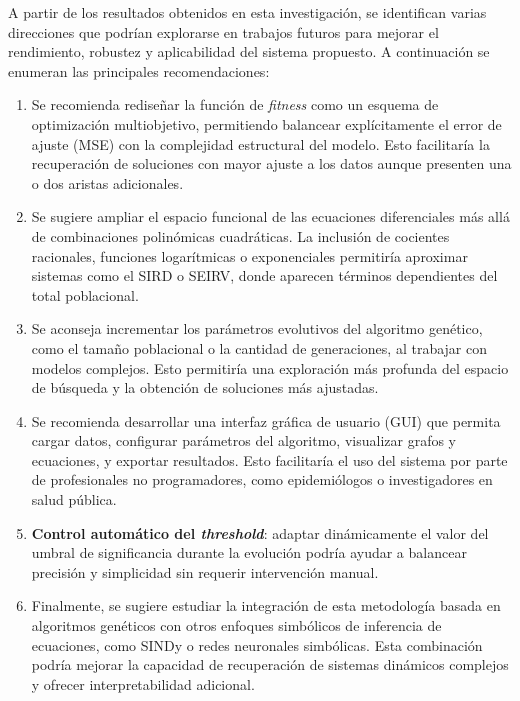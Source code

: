 \begin{recomendations}

A partir de los resultados obtenidos en esta investigación, se identifican varias direcciones que podrían explorarse en trabajos futuros para mejorar el rendimiento, robustez y aplicabilidad del sistema propuesto. A continuación se enumeran las principales recomendaciones:

\begin{enumerate}
    \item Se recomienda rediseñar la función de \textit{fitness} como un esquema de optimización multiobjetivo, permitiendo balancear explícitamente el error de ajuste (MSE) con la complejidad estructural del modelo. Esto facilitaría la recuperación de soluciones con mayor ajuste a los datos aunque presenten una o dos aristas adicionales.

    \item Se sugiere ampliar el espacio funcional de las ecuaciones diferenciales más allá de combinaciones polinómicas cuadráticas. La inclusión de cocientes racionales, funciones logarítmicas o exponenciales permitiría aproximar sistemas como el SIRD o SEIRV, donde aparecen términos dependientes del total poblacional.

    \item Se aconseja incrementar los parámetros evolutivos del algoritmo genético, como el tamaño poblacional o la cantidad de generaciones, al trabajar con modelos complejos. Esto permitiría una exploración más profunda del espacio de búsqueda y la obtención de soluciones más ajustadas.

    \item Se recomienda desarrollar una interfaz gráfica de usuario (GUI) que permita cargar datos, configurar parámetros del algoritmo, visualizar grafos y ecuaciones, y exportar resultados. Esto facilitaría el uso del sistema por parte de profesionales no programadores, como epidemiólogos o investigadores en salud pública.

    \item \textbf{Control automático del \textit{threshold}}: adaptar dinámicamente el valor del umbral de significancia durante la evolución podría ayudar a balancear precisión y simplicidad sin requerir intervención manual.


    \item Finalmente, se sugiere estudiar la integración de esta metodología basada en algoritmos genéticos con otros enfoques simbólicos de inferencia de ecuaciones, como SINDy o redes neuronales simbólicas. Esta combinación podría mejorar la capacidad de recuperación de sistemas dinámicos complejos y ofrecer interpretabilidad adicional.
\end{enumerate}



\end{recomendations}
